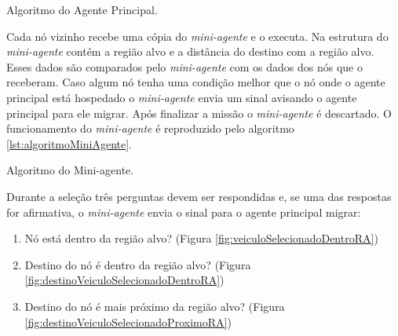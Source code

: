 \begin{algorithm}
	\scriptsize
	\caption{Algoritmo do Agente Principal.}
	\label{lst:algoritmoAgentePrincipal}
	\end{algorithm}

Cada nó vizinho recebe uma cópia do \emph{mini-agente} e o executa. Na estrutura do \emph{mini-agente} contém a região alvo e a distância do destino com a região alvo. Esses dados são comparados pelo \emph{mini-agente} com os dados dos nós que o receberam. Caso algum nó tenha uma condição melhor que o nó onde o agente principal está hospedado o \emph{mini-agente} envia um sinal avisando o agente principal para ele migrar. Após finalizar a missão o \emph{mini-agente} é descartado. O funcionamento do \emph{mini-agente} é reproduzido pelo algoritmo \ref{lst:algoritmoMiniAgente}.

\begin{algorithm}
	\scriptsize
	\caption{Algoritmo do Mini-agente.}
	\label{lst:algoritmoMiniAgente}
\end{algorithm}

Durante a seleção três perguntas devem ser respondidas e, se uma das respostas for afirmativa, o \emph{mini-agente} envia o sinal para o agente principal migrar:

\begin{enumerate}
	\item Nó está dentro da região alvo? (Figura \ref{fig:veiculoSelecionadoDentroRA})
	\item Destino do nó é dentro da região alvo? (Figura \ref{fig:destinoVeiculoSelecionadoDentroRA})
	\item Destino do nó é mais próximo da região alvo? (Figura \ref{fig:destinoVeiculoSelecionadoProximoRA})
\end{enumerate}

